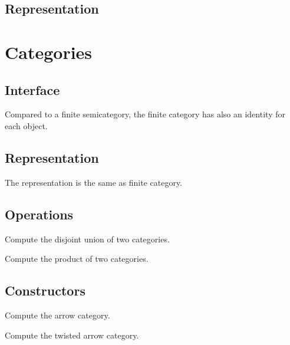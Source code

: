 \subsection*{Representation}


\section{Categories}
\subsection*{Interface}
Compared to a finite semicategory, the finite category
has also an identity for each object.

\subsection*{Representation}

The representation is the same as finite category.

\subsection*{Operations}

\begin{exercise}
  Compute the disjoint union of two categories.

\end{exercise}

\begin{exercise}
  Compute the product of two categories.

\end{exercise}


\subsection*{Constructors}


\begin{exercise}
  Compute the arrow category.

\end{exercise}


\begin{exercise}
  Compute the twisted arrow category.

\end{exercise}



